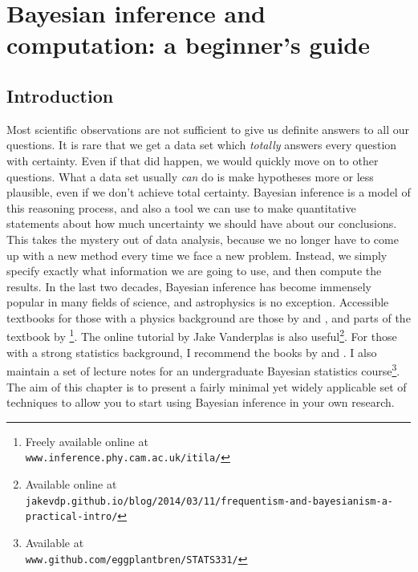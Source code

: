 \newcommand{\btheta}{\theta}
\newcommand{\data}{D}
\newcommand{\documentname}{chapter}

\author[Brendon J. Brewer]{Brendon J. Brewer\\
Department of Statistics, The University of Auckland}

\chapter{Bayesian inference and computation: a beginner's guide}

\section{Introduction}
Most scientific observations are not sufficient to give us definite answers
to all our questions. It is rare that we get a data set which {\it totally}
answers every question with certainty. Even if that did happen, we would
quickly move on to other questions.
What a data set usually {\it can} do is make hypotheses more or less plausible,
even if we don't achieve total certainty.
Bayesian inference is a model of this
reasoning process, and also a tool we can use
to make quantitative statements about how much
uncertainty we should have about our conclusions. This takes the mystery out
of data analysis, because we no longer have to come up with a new method
every time we face a new problem. Instead, we simply specify exactly what
information we are going to use, and then compute the results.
In the last two decades, Bayesian inference has become immensely popular in
many fields of science, and astrophysics is no exception. Accessible textbooks
for those with a physics background are those by \citet{gregory} and
\citet{sivia}, and parts of the textbook by \citet{mackay}\footnote{Freely
available online at\\
{\tt www.inference.phy.cam.ac.uk/itila/}}.
The online tutorial
by Jake Vanderplas is also useful\footnote{Available online at\\
{\tt jakevdp.github.io/blog/2014/03/11/frequentism-and-bayesianism-a-practical-intro/}}. For those with a strong statistics background,
I recommend the books by \citet{ohagan} and \citet{gelman}. I also maintain
a set of lecture notes for an undergraduate Bayesian statistics
course\footnote{Available at\\
{\tt www.github.com/eggplantbren/STATS331/}}.
The aim of this chapter is to present a fairly minimal yet widely applicable set of techniques to
allow you to start using Bayesian inference in your own research.

